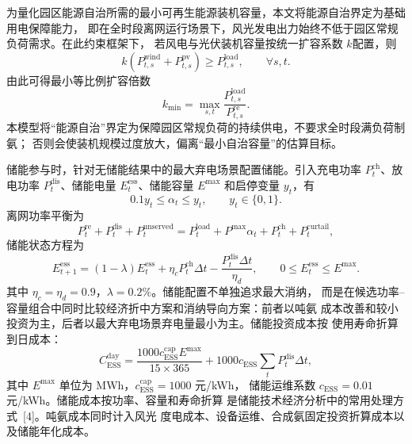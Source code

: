 为量化园区能源自治所需的最小可再生能源装机容量，本文将能源自治界定为基础用电保障能力，
即在全时段离网运行场景下，风光发电出力始终不低于园区常规负荷需求。在此约束框架下，
若风电与光伏装机容量按统一扩容系数 $k$配置，则
\begin{equation}
  k\left(P_{t,s}^{\mathrm{wind}}+P_{t,s}^{\mathrm{pv}}\right)
  \geq P_{t,s}^{\mathrm{load}},\qquad \forall s,t.
  \label{eq:p4-autonomy}
\end{equation}
由此可得最小等比例扩容倍数
\begin{equation}
  k_{\min}=
  \max_{s,t}
  \frac{P_{t,s}^{\mathrm{load}}}{P_{t,s}^{\mathrm{re}}}.
  \label{eq:p4-kmin}
\end{equation}
本模型将“能源自治”界定为保障园区常规负荷的持续供电，不要求全时段满负荷制氨；
否则会使装机规模过度放大，偏离“最小自治容量”的估算目标。

储能参与时，针对无储能结果中的最大弃电场景配置储能。引入充电功率
$P_t^{\mathrm{ch}}$、放电功率 $P_t^{\mathrm{dis}}$、储能电量
$E_t^{\mathrm{ess}}$、储能容量 $E^{\max}$ 和启停变量 $y_t$，有
\begin{equation}
  0.1y_t\leq\alpha_t\leq y_t,\qquad y_t\in\{0,1\}.
  \label{eq:p4-run-status}
\end{equation}
离网功率平衡为
\begin{equation}
  P_t^{\mathrm{re}}+P_t^{\mathrm{dis}}+P_t^{\mathrm{unserved}}
  =
  P_t^{\mathrm{load}}+P^{\max}\alpha_t+P_t^{\mathrm{ch}}+P_t^{\mathrm{curtail}},
  \label{eq:p4-storage-balance}
\end{equation}
储能状态方程为
\begin{equation}
  E_{t+1}^{\mathrm{ess}}
  =(1-\lambda)E_t^{\mathrm{ess}}
  +\eta_cP_t^{\mathrm{ch}}\Delta t
  -\frac{P_t^{\mathrm{dis}}\Delta t}{\eta_d},
  \qquad
  0\leq E_t^{\mathrm{ess}}\leq E^{\max}.
  \label{eq:p4-storage-state}
\end{equation}
其中 $\eta_c=\eta_d=0.9$，$\lambda=0.2\%$。储能配置不单独追求最大消纳，
而是在候选功率--容量组合中同时比较经济折中方案和消纳导向方案：前者以吨氨
成本改善和较小投资为主，后者以最大弃电场景弃电量最小为主。储能投资成本按
使用寿命折算到日成本：
\begin{equation}
  C_{\mathrm{ESS}}^{\mathrm{day}}
  =
  \frac{1000c_{\mathrm{ESS}}^{\mathrm{cap}}E^{\max}}{15\times365}
  +1000c_{\mathrm{ESS}}\sum_tP_t^{\mathrm{dis}}\Delta t,
  \label{eq:p4-storage-cost}
\end{equation}
其中 $E^{\max}$ 单位为 MWh，$c_{\mathrm{ESS}}^{\mathrm{cap}}=1000$ 元/kWh，
储能运维系数 $c_{\mathrm{ESS}}=0.01$ 元/kWh。储能成本按功率、容量和寿命折算
是储能技术经济分析中的常用处理方式~[4]。吨氨成本同时计入风光
度电成本、设备运维、合成氨固定投资折算成本以及储能年化成本。

